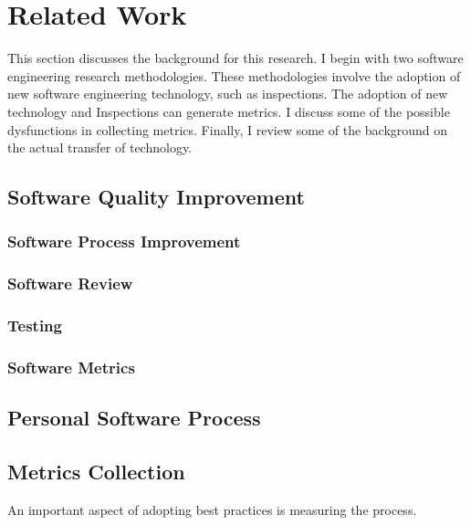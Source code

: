 
\chapter{Related Work}
\label{sec:related}

This section discusses the background for this research.  I begin with two
software engineering research methodologies.  These methodologies involve
the adoption of new software engineering technology, such as inspections.
The adoption of new technology and Inspections can generate metrics.  I
discuss some of the possible dysfunctions in collecting metrics.  Finally,
I review some of the background on the actual transfer of technology.

\section{Software Quality Improvement}
\subsection{Software Process Improvement}
\subsection{Software Review}
\subsection{Testing}
\subsection{Software Metrics}

\section{Personal Software Process}

\section{Metrics Collection}
An important aspect of adopting best practices is measuring the process.



